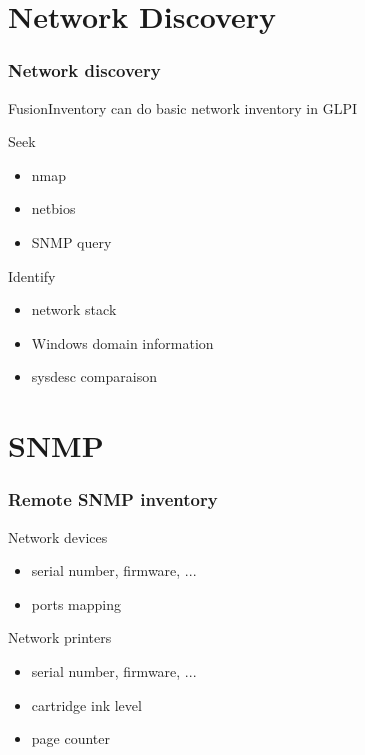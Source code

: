 \documentclass{beamer}
\begin{document}
\section{Network Discovery}

\begin{frame}
    \frametitle{Network discovery}

    FusionInventory can do basic network inventory in GLPI
    \begin{block}{Seek}
    \begin{itemize}
      \item nmap
      \item netbios
      \item SNMP query
    \end{itemize}
    \end{block}
    \begin{block}{Identify}
    \begin{itemize}
        \item network stack
        \item Windows domain information
        \item sysdesc comparaison
    \end{itemize}
    \end{block}
\end{frame}

\section{SNMP}
\begin{frame}
    \frametitle{Remote SNMP inventory}

    \begin{block}{Network devices}
        \begin{itemize}
            \item serial number, firmware, ...
            \item ports mapping
        \end{itemize}
    \end{block}

    \begin{block}{Network printers}
        \begin{itemize}
            \item serial number, firmware, ...
            \item cartridge ink level
            \item page counter
        \end{itemize}
    \end{block}
\end{frame}
\end{document}
